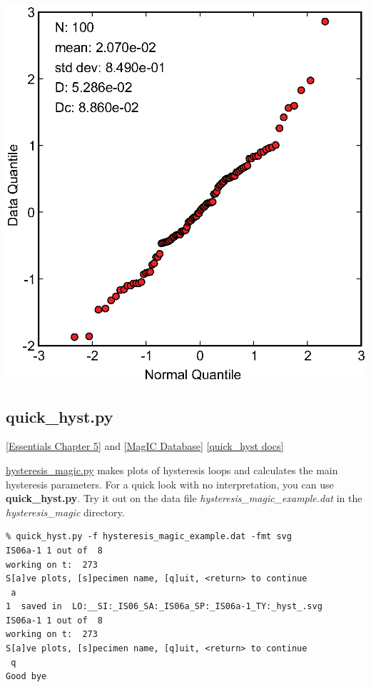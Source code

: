 \documentclass[11pt]{book}
\begin{document}
{{%
{%
\includegraphics[width=12 cm]{EPSfiles/qq.eps}}

%

\subsection{quick\_hyst.py}
\href{http://earthref.org/MAGIC/books/Tauxe/Essentials/WebBook3ch5.html#ch5}{[Essentials Chapter 5]} and \href{#MagICDatabase}{[MagIC Database]}
\href{https://github.com/PmagPy/PmagPy/blob/master/programs/quick_hyst.py}{[quick\_hyst docs]}

\href{#hysteresis_magic.py}{hysteresis\_magic.py} makes plots of hysteresis loops and calculates the main hysteresis parameters.  For a quick look with no interpretation, you can use {\bf quick\_hyst.py}.   Try it out on the data file {\it hysteresis\_magic\_example.dat} in the {\it hysteresis\_magic} directory.

\begin{verbatim}
% quick_hyst.py -f hysteresis_magic_example.dat -fmt svg
IS06a-1 1 out of  8
working on t:  273
S[a]ve plots, [s]pecimen name, [q]uit, <return> to continue
 a
1  saved in  LO:__SI:_IS06_SA:_IS06a_SP:_IS06a-1_TY:_hyst_.svg
IS06a-1 1 out of  8
working on t:  273
S[a]ve plots, [s]pecimen name, [q]uit, <return> to continue
 q
Good bye
\end{verbatim}

}}
\end{document}
